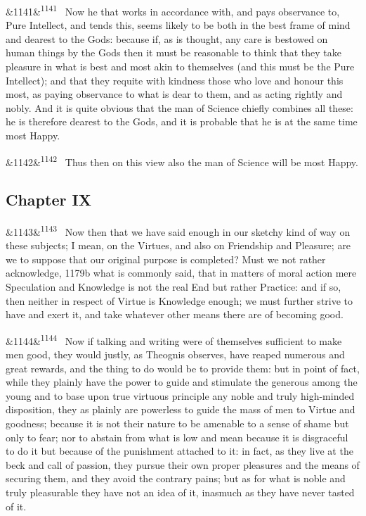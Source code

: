 \documentclass[12pt]{article}
\newcommand{\para}[1][]{\par\noindent\ifx&#1&\else\textsuperscript{\footnotesize #1}~\fi}
\begin{document}
\para[1141] Now he that works in accordance with, and pays observance to, Pure Intellect, and tends this, seems likely to be both in the best frame of mind and dearest to the Gods: because if, as is thought, any care is bestowed on human things by the Gods then it must be reasonable to think that they take pleasure in what is best and most akin to themselves (and this must be the Pure Intellect); and that they requite with kindness those who love and honour this most, as paying observance to what is dear to them, and as acting rightly and nobly. And it is quite obvious that the man of Science chiefly combines all these: he is therefore dearest to the Gods, and it is probable that he is at the same time most Happy.

\para[1142] Thus then on this view also the man of Science will be most Happy.

\subsection*{Chapter IX}

\para[1143] Now then that we have said enough in our sketchy kind of way on these subjects; I mean, on the Virtues, and also on Friendship and Pleasure; are we to suppose that our original purpose is completed? Must we not rather acknowledge, 1179b what is commonly said, that in matters of moral action mere Speculation and Knowledge is not the real End but rather Practice: and if so, then neither in respect of Virtue is Knowledge enough; we must further strive to have and exert it, and take whatever other means there are of becoming good.

\para[1144] Now if talking and writing were of themselves sufficient to make men good, they would justly, as Theognis observes, have reaped numerous and great rewards, and the thing to do would be to provide them: but in point of fact, while they plainly have the power to guide and stimulate the generous among the young and to base upon true virtuous principle any noble and truly high-minded disposition, they as plainly are powerless to guide the mass of men to Virtue and goodness; because it is not their nature to be amenable to a sense of shame but only to fear; nor to abstain from what is low and mean because it is disgraceful to do it but because of the punishment attached to it: in fact, as they live at the beck and call of passion, they pursue their own proper pleasures and the means of securing them, and they avoid the contrary pains; but as for what is noble and truly pleasurable they have not an idea of it, inasmuch as they have never tasted of it.
\end{document}
